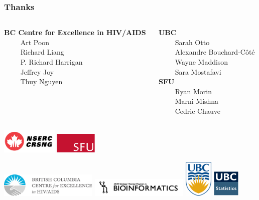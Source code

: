 \documentclass{beamer}
\begin{document}
\begin{frame}
    \frametitle{Thanks}
    \begin{columns}
        \begin{column}{0.5\textwidth}
            \textbf{BC Centre for Excellence in HIV/AIDS} \\
            $\qquad$ Art Poon \\
            $\qquad$ Richard Liang \\
            $\qquad$ P. Richard Harrigan \\
            $\qquad$ Jeffrey Joy \\
            $\qquad$ Thuy Nguyen
        \end{column}
        \begin{column}{0.5\textwidth}
            \textbf{UBC} \\
            $\qquad$ Sarah Otto \\
            $\qquad$ Alexandre Bouchard-C\^ot\'e \\
            $\qquad$ Wayne Maddison \\
            $\qquad$ Sara Mostafavi \\
            \textbf{SFU} \\
            $\qquad$ Ryan Morin \\
            $\qquad$ Marni Mishna \\
            $\qquad$ Cedric Chauve
        \end{column}
    \end{columns}

    \includegraphics[width=0.2\textwidth]{nserc}
    \hspace{0.2cm}
    \includegraphics[width=0.15\textwidth]{sfu}

    \includegraphics[width=0.35\textwidth]{cfe}
    \includegraphics[width=0.35\textwidth]{btp}
    \includegraphics[width=0.1\textwidth]{ubc}
    \hspace{0.5cm}
    \includegraphics[width=0.1\textwidth]{ubcstats}
\end{frame}
\end{document}
